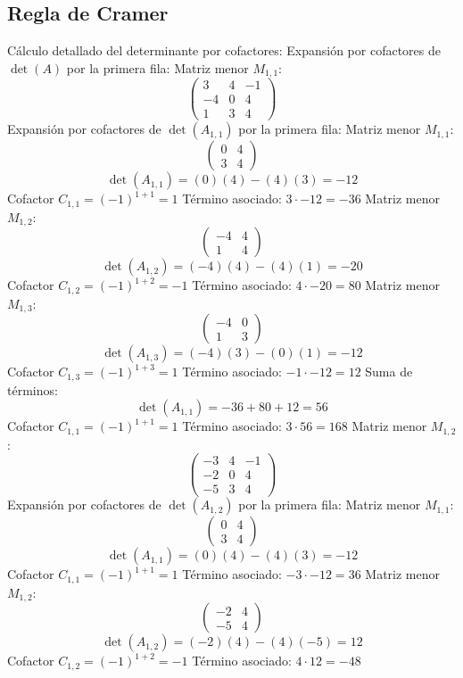 \documentclass{article}
\begin{document}
\subsection*{Regla de Cramer}
Cálculo detallado del determinante por cofactores:
Expansión por cofactores de $\det(A)$ por la primera fila:
Matriz menor $M_{1,1}$:
\[\begin{pmatrix}3 & 4 & -1 \\ -4 & 0 & 4 \\ 1 & 3 & 4\end{pmatrix}\]
Expansión por cofactores de $\det(A_{1,1})$ por la primera fila:
Matriz menor $M_{1,1}$:
\[\begin{pmatrix}0 & 4 \\ 3 & 4\end{pmatrix}\]
\[\det(A_{1,1}) = (0)(4) - (4)(3) = -12\]
Cofactor $C_{1,1} = (-1)^{1+1} = 1$
Término asociado: $ 3 \cdot -12 = -36 $
Matriz menor $M_{1,2}$:
\[\begin{pmatrix}-4 & 4 \\ 1 & 4\end{pmatrix}\]
\[\det(A_{1,2}) = (-4)(4) - (4)(1) = -20\]
Cofactor $C_{1,2} = (-1)^{1+2} = -1$
Término asociado: $ 4 \cdot -20 = 80 $
Matriz menor $M_{1,3}$:
\[\begin{pmatrix}-4 & 0 \\ 1 & 3\end{pmatrix}\]
\[\det(A_{1,3}) = (-4)(3) - (0)(1) = -12\]
Cofactor $C_{1,3} = (-1)^{1+3} = 1$
Término asociado: $ -1 \cdot -12 = 12 $
Suma de términos:
\[\det(A_{1,1}) = -36 + 80 + 12 = 56\]
Cofactor $C_{1,1} = (-1)^{1+1} = 1$
Término asociado: $ 3 \cdot 56 = 168 $
Matriz menor $M_{1,2}$:
\[\begin{pmatrix}-3 & 4 & -1 \\ -2 & 0 & 4 \\ -5 & 3 & 4\end{pmatrix}\]
Expansión por cofactores de $\det(A_{1,2})$ por la primera fila:
Matriz menor $M_{1,1}$:
\[\begin{pmatrix}0 & 4 \\ 3 & 4\end{pmatrix}\]
\[\det(A_{1,1}) = (0)(4) - (4)(3) = -12\]
Cofactor $C_{1,1} = (-1)^{1+1} = 1$
Término asociado: $ -3 \cdot -12 = 36 $
Matriz menor $M_{1,2}$:
\[\begin{pmatrix}-2 & 4 \\ -5 & 4\end{pmatrix}\]
\[\det(A_{1,2}) = (-2)(4) - (4)(-5) = 12\]
Cofactor $C_{1,2} = (-1)^{1+2} = -1$
Término asociado: $ 4 \cdot 12 = -48 $
\end{document}
